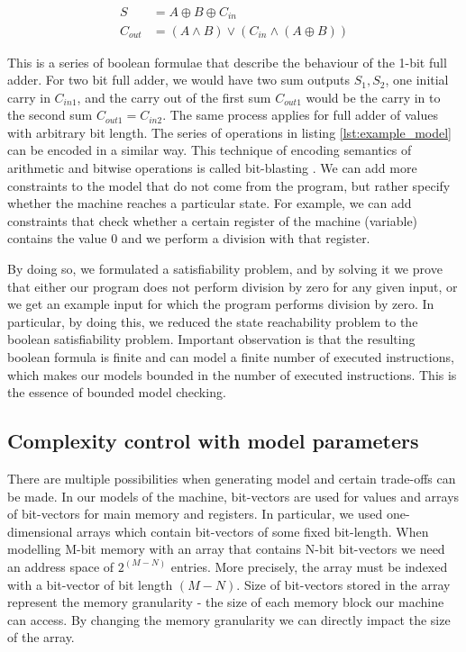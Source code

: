 \documentclass[12pt]{article}
\begin{document}
\begin{align*}
    S	    &= A \oplus B \oplus C_{in} \\
    C_{out} &= (A \land B) \lor (C_{in} \land (A \oplus B))
\end{align*}

This is a series of boolean formulae that describe the behaviour of the 1-bit
full adder. For two bit full adder, we would have two sum outputs $S_1, S_2$,
one initial carry in $C_{in1}$, and the carry out of the first sum $C_{out1}$
would be the carry in to the second sum $C_{out1} = C_{in2}$. The same process
applies for full adder of values with arbitrary bit length. The series of
operations in listing \ref{lst:example_model} can be encoded in a similar
way. This technique of encoding semantics of arithmetic and bitwise operations
is called bit-blasting \cite{barrett2021satisfiability}. We can add more
constraints to the model that do not come from the program, but rather specify
whether the machine reaches a particular state. For example, we can add
constraints that check whether a certain register of the machine (variable)
contains the value $0$ and we perform a division with that register. 

By doing so, we formulated a satisfiability problem, and by solving it we prove
that either our program does not perform division by zero for any given input,
or we get an example input for which the program performs division by zero. In
particular, by doing this, we reduced the state reachability problem to the
boolean satisfiability problem. Important observation is that the resulting 
boolean formula is finite and can model a finite number of executed
instructions, which makes our models bounded in the number of executed
instructions. This is the essence of bounded model checking.


\subsection{Complexity control with model parameters}

There are multiple possibilities when generating model and certain trade-offs
can be made. In our models of the machine, bit-vectors are used for values and
arrays of bit-vectors for main memory and registers. In particular, we used
one-dimensional arrays which contain bit-vectors of some fixed bit-length. When
modelling M-bit memory with an array that contains N-bit bit-vectors we need an
address space of $2^{(M - N)}$ entries. More precisely, the array must be
indexed with a bit-vector of bit length $(M - N)$. Size of bit-vectors stored
in the array represent the memory granularity - the size of each memory block
our machine can access. By changing the memory granularity we can directly
impact the size of the array.
\end{document}
